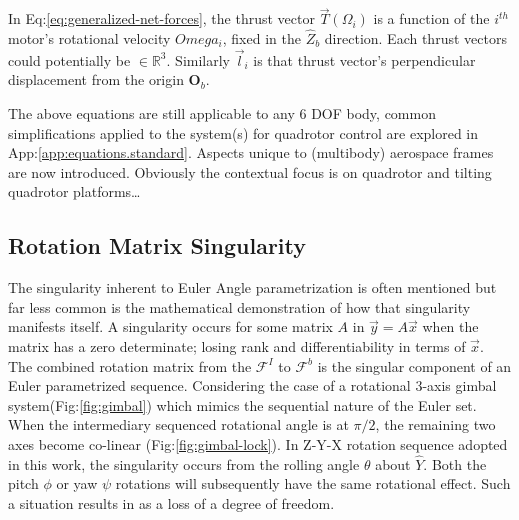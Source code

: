 In Eq:\ref{eq:generalized-net-forces}, the thrust vector $\vec{T}(\Omega_i)$ is a function of the $i^{th}$ motor's rotational velocity $Omega_i$, fixed in the $\hat{Z}_b$ direction. Each thrust vectors could potentially be $\in\mathbb{R}^3$. Similarly $\vec{l}_i$ is that thrust vector's perpendicular displacement from the origin $\mathbf{O}_b$. 
\par
The above equations are still applicable to any 6 DOF body, common simplifications applied to the system(s) for quadrotor control are explored in App:\ref{app:equations.standard}. Aspects unique to (multibody) aerospace frames are now introduced. Obviously the contextual focus is on quadrotor and tilting quadrotor platforms\ldots
\subsection{Rotation Matrix Singularity}\label{subsec:dynamics.rigidbody.singularity}
The singularity inherent to Euler Angle parametrization is often mentioned but far less common is the mathematical demonstration of how that singularity manifests itself.  A singularity occurs for some matrix $A$ in $\vec{y}=A\vec{x}$ when the matrix has a zero determinate; losing rank and differentiability in terms of $\vec{x}$. The combined rotation matrix from the $\mathcal{F}^{I}$ to $\mathcal{F}^{b}$ is the singular component of an Euler parametrized sequence. Considering the case of a rotational 3-axis gimbal system(Fig:\ref{fig:gimbal}) which mimics the sequential nature of the Euler set. When the intermediary sequenced rotational angle is at $\pi/2$, the remaining two axes become co-linear (Fig:\ref{fig:gimbal-lock}). In Z-Y-X rotation sequence adopted in this work, the singularity occurs from the rolling angle $\theta$ about $\hat{Y}$. Both the pitch $\phi$ or yaw $\psi$ rotations will subsequently have the same rotational effect. Such a situation results in as a loss of a degree of freedom.
